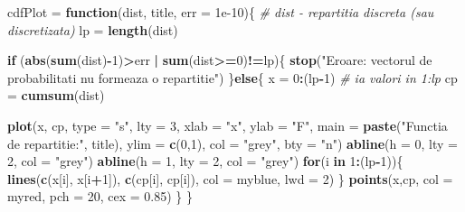 \documentclass[]{article}
\newenvironment{Shaded}{\begin{snugshade}}{\end{snugshade}}
\newcommand{\KeywordTok}[1]{\textcolor[rgb]{0.13,0.29,0.53}{\textbf{#1}}}
\newcommand{\DataTypeTok}[1]{\textcolor[rgb]{0.13,0.29,0.53}{#1}}
\newcommand{\DecValTok}[1]{\textcolor[rgb]{0.00,0.00,0.81}{#1}}
\newcommand{\FloatTok}[1]{\textcolor[rgb]{0.00,0.00,0.81}{#1}}
\newcommand{\StringTok}[1]{\textcolor[rgb]{0.31,0.60,0.02}{#1}}
\newcommand{\CommentTok}[1]{\textcolor[rgb]{0.56,0.35,0.01}{\textit{#1}}}
\newcommand{\ControlFlowTok}[1]{\textcolor[rgb]{0.13,0.29,0.53}{\textbf{#1}}}
\newcommand{\OperatorTok}[1]{\textcolor[rgb]{0.81,0.36,0.00}{\textbf{#1}}}
\newcommand{\NormalTok}[1]{#1}
\begin{document}
\begin{Shaded}
\begin{Highlighting}[]
\NormalTok{cdfPlot =}\StringTok{ }\ControlFlowTok{function}\NormalTok{(dist, title, }\DataTypeTok{err =} \FloatTok{1e-10}\NormalTok{)\{}
  \CommentTok{# dist - repartitia discreta (sau discretizata)}
\NormalTok{  lp =}\StringTok{ }\KeywordTok{length}\NormalTok{(dist)}
  
  \ControlFlowTok{if}\NormalTok{ (}\KeywordTok{abs}\NormalTok{(}\KeywordTok{sum}\NormalTok{(dist)}\OperatorTok{-}\DecValTok{1}\NormalTok{)}\OperatorTok{>}\NormalTok{err }\OperatorTok{|}\StringTok{ }\KeywordTok{sum}\NormalTok{(dist}\OperatorTok{>=}\DecValTok{0}\NormalTok{)}\OperatorTok{!=}\NormalTok{lp)\{}
    \KeywordTok{stop}\NormalTok{(}\StringTok{"Eroare: vectorul de probabilitati nu formeaza o repartitie"}\NormalTok{)}
\NormalTok{  \}}\ControlFlowTok{else}\NormalTok{\{}
\NormalTok{    x =}\StringTok{ }\DecValTok{0}\OperatorTok{:}\NormalTok{(lp}\OperatorTok{-}\DecValTok{1}\NormalTok{) }\CommentTok{# ia valori in 1:lp}
\NormalTok{    cp =}\StringTok{ }\KeywordTok{cumsum}\NormalTok{(dist)}
    
    \KeywordTok{plot}\NormalTok{(x, cp, }\DataTypeTok{type =} \StringTok{"s"}\NormalTok{, }\DataTypeTok{lty =} \DecValTok{3}\NormalTok{, }
         \DataTypeTok{xlab =} \StringTok{"x"}\NormalTok{, }
         \DataTypeTok{ylab =} \StringTok{"F"}\NormalTok{, }
         \DataTypeTok{main =} \KeywordTok{paste}\NormalTok{(}\StringTok{"Functia de repartitie:"}\NormalTok{, title), }
         \DataTypeTok{ylim =} \KeywordTok{c}\NormalTok{(}\DecValTok{0}\NormalTok{,}\DecValTok{1}\NormalTok{), }
         \DataTypeTok{col =} \StringTok{"grey"}\NormalTok{,}
         \DataTypeTok{bty =} \StringTok{"n"}\NormalTok{)}
    \KeywordTok{abline}\NormalTok{(}\DataTypeTok{h =} \DecValTok{0}\NormalTok{, }\DataTypeTok{lty =} \DecValTok{2}\NormalTok{, }\DataTypeTok{col =} \StringTok{"grey"}\NormalTok{)}
    \KeywordTok{abline}\NormalTok{(}\DataTypeTok{h =} \DecValTok{1}\NormalTok{, }\DataTypeTok{lty =} \DecValTok{2}\NormalTok{, }\DataTypeTok{col =} \StringTok{"grey"}\NormalTok{)}
    \ControlFlowTok{for}\NormalTok{(i }\ControlFlowTok{in} \DecValTok{1}\OperatorTok{:}\NormalTok{(lp}\OperatorTok{-}\DecValTok{1}\NormalTok{))\{}
      \KeywordTok{lines}\NormalTok{(}\KeywordTok{c}\NormalTok{(x[i], x[i}\OperatorTok{+}\DecValTok{1}\NormalTok{]), }\KeywordTok{c}\NormalTok{(cp[i], cp[i]), }
            \DataTypeTok{col =}\NormalTok{ myblue,}
            \DataTypeTok{lwd =} \DecValTok{2}\NormalTok{)}
\NormalTok{    \}}
    \KeywordTok{points}\NormalTok{(x,cp, }\DataTypeTok{col =}\NormalTok{ myred, }\DataTypeTok{pch =} \DecValTok{20}\NormalTok{, }\DataTypeTok{cex =} \FloatTok{0.85}\NormalTok{)}
\NormalTok{  \}}
\NormalTok{\}}
\end{Highlighting}
\end{Shaded}
\end{document}
